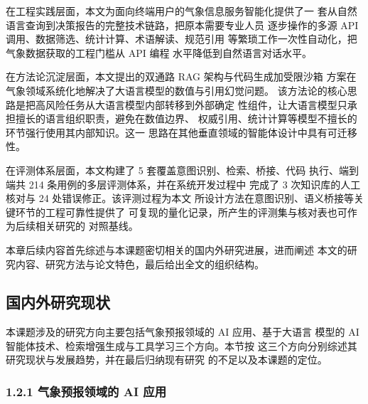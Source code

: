 \documentclass[a4paper]{article}
\theoremstyle{definition}
\theoremstyle{plain}
\theoremstyle{remark}
\let\oldcite\cite
\renewcommand{\cite}[1]{\textsuperscript{\oldcite{#1}}}
\begin{document}
在工程实践层面，本文为面向终端用户的气象信息服务智能化提供了一
套从自然语言查询到决策报告的完整技术链路，把原本需要专业人员
逐步操作的多源 API 调用、数据筛选、统计计算、术语解读、规范引用
等繁琐工作一次性自动化，把气象数据获取的工程门槛从 API 编程
水平降低到自然语言对话水平。

在方法论沉淀层面，本文提出的双通路 RAG 架构与代码生成加受限沙箱
方案在气象领域系统化地解决了大语言模型的数值与引用幻觉问题。
该方法论的核心思路是把高风险任务从大语言模型内部转移到外部确定
性组件，让大语言模型只承担擅长的语言组织职责，避免在数值边界、
权威引用、统计计算等模型不擅长的环节强行使用其内部知识。这一
思路在其他垂直领域的智能体设计中具有可迁移性。

在评测体系层面，本文构建了 5 套覆盖意图识别、检索、桥接、代码
执行、端到端共 214 条用例的多层评测体系，并在系统开发过程中
完成了 3 次知识库的人工核对与 24 处错误修正。该评测过程为本文
所设计方法在意图识别、语义桥接等关键环节的工程可靠性提供了
可复现的量化记录，所产生的评测集与核对表也可作为后续相关研究的
对照基线。

本章后续内容首先综述与本课题密切相关的国内外研究进展，进而阐述
本文的研究内容、研究方法与论文特色，最后给出全文的组织结构。




\subsection{国内外研究现状}
\label{sec:related-work}

本课题涉及的研究方向主要包括气象预报领域的 AI 应用、基于大语言
模型的 AI 智能体技术、检索增强生成与工具学习三个方向。本节按
这三个方向分别综述其研究现状与发展趋势，并在最后归纳现有研究
的不足以及本课题的定位。

\subsubsection*{1.2.1 \quad 气象预报领域的 AI 应用}
\end{document}
